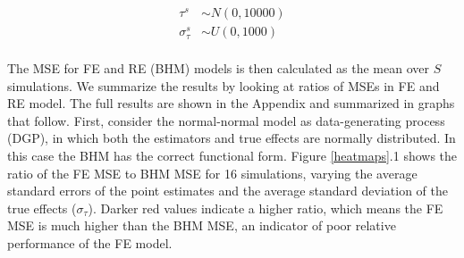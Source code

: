 \documentclass[12pt]{article}
\begin{document}


\begin{equation}
\begin{aligned}
\tau^s &\sim N(0, 10000) \\
\sigma_{\tau}^s &\sim U(0,1000) \\
\end{aligned}
\end{equation}




The MSE for FE and RE (BHM) models is then calculated as the mean over $S$ simulations. We summarize the results by looking at ratios of MSEs in FE and RE model. The full results are shown in the Appendix and summarized in graphs that follow. First, consider the normal-normal model as data-generating process (DGP), in which both the estimators and true effects are normally distributed. In this case the BHM has the correct functional form. Figure \ref{heatmaps}.1 shows the ratio of the FE MSE to BHM MSE for 16 simulations, varying the average standard errors of the point estimates and the average standard deviation of the true effects ($\sigma_{\tau}$). Darker red values indicate a higher ratio, which means the FE MSE is much higher than the BHM MSE, an indicator of poor relative performance of the FE model.
\end{document}
